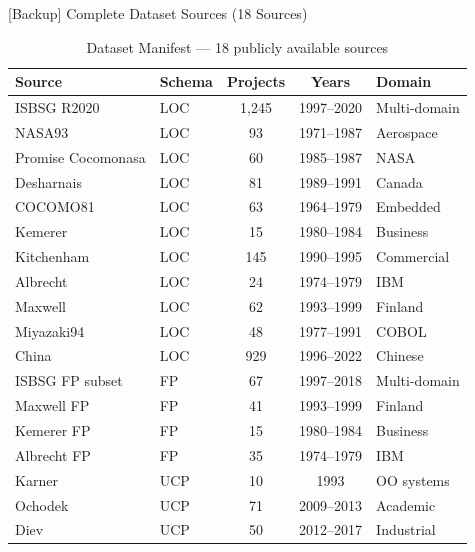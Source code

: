 \documentclass[aspectratio=169]{beamer}
\begin{document}
\begin{frame}{[Backup] Complete Dataset Sources (18 Sources)}
\begin{table}
\tiny
\caption{Dataset Manifest --- 18 publicly available sources}
\begin{tabular}{llccl}
\toprule
\textbf{Source} & \textbf{Schema} & \textbf{Projects} & \textbf{Years} & \textbf{Domain} \\
\midrule
ISBSG R2020        & LOC & 1,245 & 1997--2020 & Multi-domain \\
NASA93             & LOC & 93    & 1971--1987 & Aerospace \\
Promise Cocomonasa & LOC & 60    & 1985--1987 & NASA \\
Desharnais         & LOC & 81    & 1989--1991 & Canada \\
COCOMO81           & LOC & 63    & 1964--1979 & Embedded \\
Kemerer            & LOC & 15    & 1980--1984 & Business \\
Kitchenham         & LOC & 145   & 1990--1995 & Commercial \\
Albrecht           & LOC & 24    & 1974--1979 & IBM \\
Maxwell            & LOC & 62    & 1993--1999 & Finland \\
Miyazaki94         & LOC & 48    & 1977--1991 & COBOL \\
China              & LOC & 929   & 1996--2022 & Chinese \\
\midrule
ISBSG FP subset    & FP  & 67    & 1997--2018 & Multi-domain \\
Maxwell FP         & FP  & 41    & 1993--1999 & Finland \\
Kemerer FP         & FP  & 15    & 1980--1984 & Business \\
Albrecht FP        & FP  & 35    & 1974--1979 & IBM \\
\midrule
Karner             & UCP & 10    & 1993       & OO systems \\
Ochodek            & UCP & 71    & 2009--2013 & Academic \\
Diev               & UCP & 50    & 2012--2017 & Industrial \\
\bottomrule
\end{tabular}
\end{table}
\end{frame}
\end{document}
